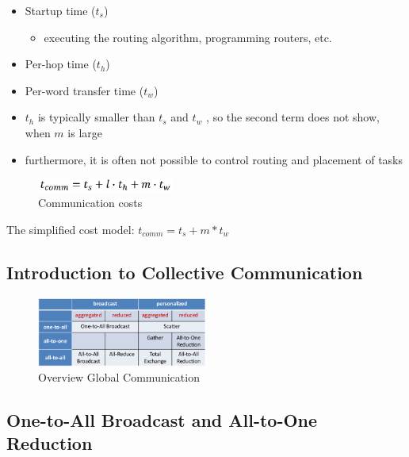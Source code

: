 \begin{itemize}
\tightlist
\item
  Startup time ($t_s$)

  \begin{itemize}
  \tightlist
  \item
    executing the routing algorithm, programming routers, etc.
  \end{itemize}
\item
  Per-hop time ($t_h$)
\item
  Per-word transfer time ($t_w$)
\item
  $t_h$ is typically smaller than $t_s$ and $t_w$ , so the second term does
  not show, when $m$ is large
\item
  furthermore, it is often not possible to control routing and placement
  of tasks
\end{itemize}

\begin{figure}[H]
\centering
\includegraphics[width=0.4\textwidth]{figures/communicationCosts.png}
\caption{Communication costs}
\end{figure}

\begin{tcolorbox}[colback=red!5!white,colframe=red!75!black]
The simplified cost model: $t_{comm} = t_s + m * t_w$
\end{tcolorbox}

\hypertarget{introduction-to-collective-communication}{%
\subsection{Introduction to Collective
Communication}\label{introduction-to-collective-communication}}

\begin{figure}[H]
\centering
\includegraphics[width=0.5\textwidth]{figures/globalCommunication.png}
\caption{Overview Global Communication}
\end{figure}

\hypertarget{one-to-all-broadcast-and-all-to-one-reduction}{%
\subsection{One-to-All Broadcast and All-to-One
Reduction}\label{one-to-all-broadcast-and-all-to-one-reduction}}

